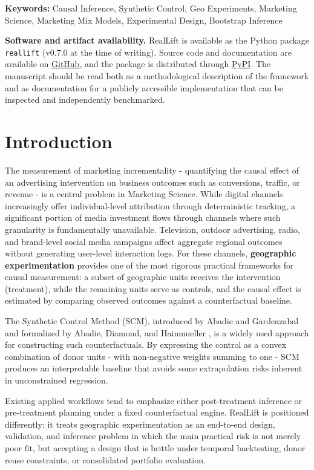 \documentclass[11pt]{article}
\begin{document}
\noindent\textbf{Keywords:} Causal Inference, Synthetic Control, Geo Experiments, Marketing Science, Marketing Mix Models, Experimental Design, Bootstrap Inference

\medskip
\noindent\textbf{Software and artifact availability.} RealLift is available as the Python package \texttt{reallift} (v0.7.0 at the time of writing). Source code and documentation are available on \href{https://github.com/RobertoJuniorWXYZ/RealLift}{GitHub}, and the package is distributed through \href{https://pypi.org/project/reallift/}{PyPI}. The manuscript should be read both as a methodological description of the framework and as documentation for a publicly accessible implementation that can be inspected and independently benchmarked.

\section{Introduction}
The measurement of marketing incrementality - quantifying the causal effect of an advertising intervention on business outcomes such as conversions, traffic, or revenue - is a central problem in Marketing Science. While digital channels increasingly offer individual-level attribution through deterministic tracking, a significant portion of media investment flows through channels where such granularity is fundamentally unavailable. Television, outdoor advertising, radio, and brand-level social media campaigns affect aggregate regional outcomes without generating user-level interaction logs. For these channels, \textbf{geographic experimentation} provides one of the most rigorous practical frameworks for causal measurement: a subset of geographic units receives the intervention (treatment), while the remaining units serve as controls, and the causal effect is estimated by comparing observed outcomes against a counterfactual baseline.

The Synthetic Control Method (SCM), introduced by Abadie and Gardeazabal \cite{ref1} and formalized by Abadie, Diamond, and Hainmueller \cite{ref2,ref3}, is a widely used approach for constructing such counterfactuals. By expressing the control as a convex combination of donor units - with non-negative weights summing to one - SCM produces an interpretable baseline that avoids some extrapolation risks inherent in unconstrained regression.

Existing applied workflows tend to emphasize either post-treatment inference or pre-treatment planning under a fixed counterfactual engine. RealLift is positioned differently: it treats geographic experimentation as an end-to-end design, validation, and inference problem in which the main practical risk is not merely poor fit, but accepting a design that is brittle under temporal backtesting, donor reuse constraints, or consolidated portfolio evaluation.
\end{document}
